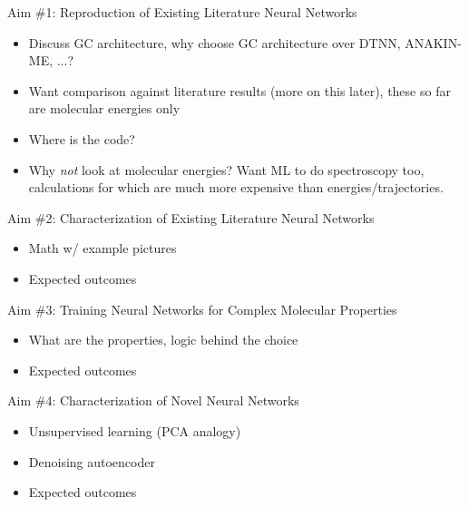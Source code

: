 \documentclass[xetex,compress]{beamer}
\begin{document}
\begin{frame}{Aim \#1: Reproduction of Existing Literature Neural Networks}
  \begin{itemize}
  \item Discuss GC architecture, why choose GC architecture over DTNN, ANAKIN-ME, ...?
  \item Want comparison against literature results (more on this later), these so far are molecular energies only
  \item Where is the code?
  \item Why \emph{not} look at molecular energies? Want ML to do spectroscopy too, calculations for which are much more expensive than energies/trajectories.
  \end{itemize}
\end{frame}

\begin{frame}{Aim \#2: Characterization of Existing Literature Neural Networks}
  \begin{itemize}
  \item Math w/ example pictures
  \item Expected outcomes
  \end{itemize}
\end{frame}

\begin{frame}{Aim \#3: Training Neural Networks for Complex Molecular Properties}
  \begin{itemize}
  \item What are the properties, logic behind the choice
  \item Expected outcomes
  \end{itemize}
\end{frame}

\begin{frame}{Aim \#4: Characterization of Novel Neural Networks}
  \begin{itemize}
  \item Unsupervised learning (PCA analogy)
  \item Denoising autoencoder
  \item Expected outcomes
  \end{itemize}
\end{frame}
\end{document}
